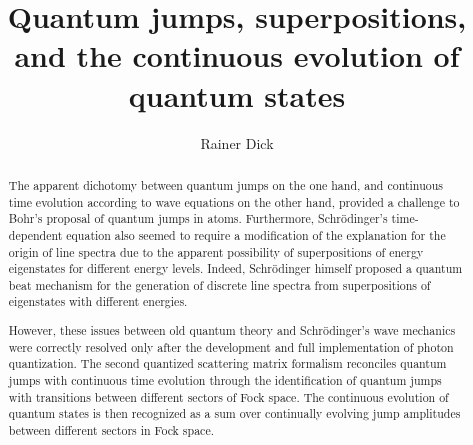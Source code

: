 \documentclass[final,3p,12pt]{elsarticle3}
\begin{document}
\begin{frontmatter}



\title{Quantum jumps, superpositions, and the continuous evolution of quantum states}



\author{Rainer Dick}


\address{Department of Physics and Engineering Physics, 
University of Saskatchewan, Saskatoon, Canada SK S7N 5E2\\
}

\begin{abstract}
The apparent dichotomy between quantum jumps on the one hand,
and continuous time evolution according to wave equations on the other hand,
provided a challenge to Bohr's proposal of quantum jumps in atoms.
 Furthermore, Schr\"odinger's time-dependent equation also seemed to
require a modification of the explanation for the origin of line
spectra due to the apparent possibility of superpositions of energy
eigenstates for different energy levels.
Indeed, Schr\"odinger himself proposed a quantum beat mechanism for the generation
of discrete line spectra from superpositions of eigenstates with different energies.

However, these issues between old quantum theory and Schr\"odinger's
wave mechanics were correctly resolved only after the development 
and full implementation of photon quantization.
The second quantized scattering matrix formalism reconciles quantum jumps with 
continuous time evolution through the identification of quantum jumps with
transitions between different sectors of Fock space. The
continuous evolution of quantum states is then recognized as a sum over continually 
evolving jump amplitudes between different sectors in Fock space.


\end{abstract}
\end{frontmatter}
\end{document}
